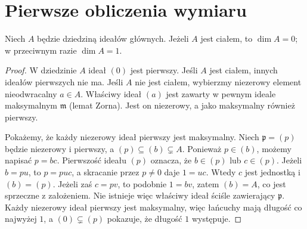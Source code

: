 \section{Pierwsze obliczenia wymiaru}
\begin{twierdzenie}\label{aa:tw:krull-pid}
Niech $A$ będzie dziedziną ideałów głównych. Jeżeli $A$ jest
ciałem, to $\dim A=0$; w przeciwnym razie $\dim A=1$.
\end{twierdzenie}
\begin{proof}
W dziedzinie $A$ ideał $(0)$ jest pierwszy. Jeśli $A$ jest
ciałem, innych ideałów pierwszych nie ma.
Jeśli $A$ nie jest ciałem, wybierzmy niezerowy element
nieodwracalny $a\in A$. Właściwy ideał $(a)$ jest zawarty
w pewnym ideale maksymalnym $\mathfrak m$ (lemat Zorna).
Jest on niezerowy, a jako maksymalny również pierwszy.

Pokażemy, że każdy niezerowy ideał pierwszy jest maksymalny.
Niech $\mathfrak p=(p)$ będzie niezerowy i pierwszy,
a $(p)\subseteq (b)\subsetneq A$. Ponieważ $p\in(b)$,
możemy napisać $p=bc$. Pierwszość ideału $(p)$ oznacza,
że $b\in(p)$ lub $c\in(p)$. Jeżeli $b=pu$, to
$p=puc$, a skracanie przez $p\ne0$ daje $1=uc$.
Wtedy $c$ jest jednostką i $(b)=(p)$. Jeżeli zaś
$c=pv$, to podobnie $1=bv$, zatem $(b)=A$,
co jest sprzeczne z założeniem. Nie istnieje więc
właściwy ideał ściśle zawierający $\mathfrak p$.
Każdy niezerowy ideał pierwszy jest maksymalny, więc łańcuchy
mają długość co najwyżej $1$, a $(0)\subsetneq(p)$
pokazuje, że długość $1$ występuje.
\end{proof}

